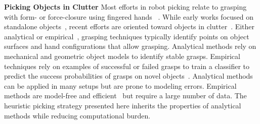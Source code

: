 
\noindent \textbf{Picking Objects in Clutter} Most efforts in robot picking relate to grasping with form- or force-closure using fingered hands ~\cite{Sahbani:2012:OOG:2109688.2109859}. While early works focused on standalone objects~\cite{doi:10.1177/027836499601500302}, recent efforts are oriented toward objects in clutter~\cite{Bohg:2014:DGS:2714095.2714355,Boularias-2014-7951,Boularias:2015:LMU:2887007.2887192}. Either analytical or empirical~\cite{Bohg:2014:DGS:2714095.2714355}, grasping techniques typically identify points on object surfaces and hand configurations that allow grasping. Analytical methods rely on mechanical and geometric object models to identify stable grasps. Empirical techniques rely on examples of successful or failed grasps to train a classifier to predict the success probabilities of grasps on novel objects~\cite{DBLP:journals/corr/abs-1804-05172}. Analytical methods can be applied in many setups but are prone to modeling errors. Empirical methods are model-free and efficient~\cite{mahler2017binpicking} but require a large number of data. The heuristic picking strategy presented here inherits the properties of analytical methods while reducing computational burden. 




